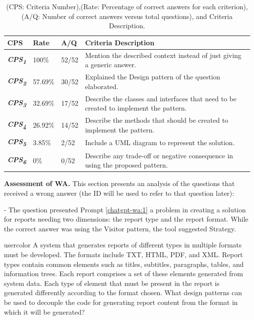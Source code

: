\begin{table}[!ht] 
    \small
    \centering
    \caption{(CPS: Criteria Number),(Rate: Percentage of correct answers for each criterion), (A/Q: Number of correct answers versus total questions), and Criteria Description.}
    \label{table:cps}
    \begin{tabular}{p{0.4in}p{0.5in}p{0.5in}p{4.0in}}       
        \toprule
         \hline
        \rowcolor{gray!19} \textbf{CPS}  & \textbf{Rate} & \textbf{A/Q} & \textbf{Criteria Description}  ~\\ \hline      
        \textbf{\textit{CPS\textsubscript{1}}} & 100\% & 52/52 & Mention the described context instead of just giving a generic answer. ~\\ \hline
        \rowcolor{gray!19} \textbf{\textit{CPS\textsubscript{2}}} & 57.69\% & 30/52 & Explained the Design pattern of the question elaborated.  ~\\ \hline
       \textbf{\textit{CPS\textsubscript{3}}} & 32.69\% & 17/52  & Describe the classes and interfaces that need to be created to implement the pattern. ~\\ \hline
       \rowcolor{gray!19} \textbf{\textit{CPS\textsubscript{4}}} & 26.92\% & 14/52  & Describe the methods that should be created to implement the pattern. ~\\ \hline
       \textbf{\textit{CPS\textsubscript{5}}} & 3.85\% & 2/52  & Include a UML diagram to represent
        the solution. ~\\ \hline
       \rowcolor{gray!19} \textbf{\textit{CPS\textsubscript{6}}} & 0\% & 0/52  & Describe any trade-off or negative consequence in using the proposed pattern. ~\\ \hline
       \bottomrule
    \end{tabular}
    \objectsource{\objectsourceauthor}
\end{table}


\textbf{Assessment of \ac{WA}.} This section presents an analysis of the questions that received a wrong answer (the ID will be used to refer to that question later):

 - The question presented Prompt \ref{chatgpt-wa:1}  a problem in creating a solution for reports needing two dimensions: the report type and the report format. While the correct answer was using the Visitor pattern, the tool suggested Strategy.
\begin{chatquest}{usercolor}{\chatgptquest[chatgpt-wa:1]}
A system that generates reports of different types in multiple formats must be developed. The formats include TXT, HTML, PDF, and XML. Report types contain common elements such as titles, subtitles, paragraphs, tables, and information trees. Each report comprises a set of these elements generated from system data. Each type of element that must be present in the report is generated differently according to the format chosen. What design patterns can be used to decouple the code for generating report content from the format in which it will be generated?
\end{chatquest}

